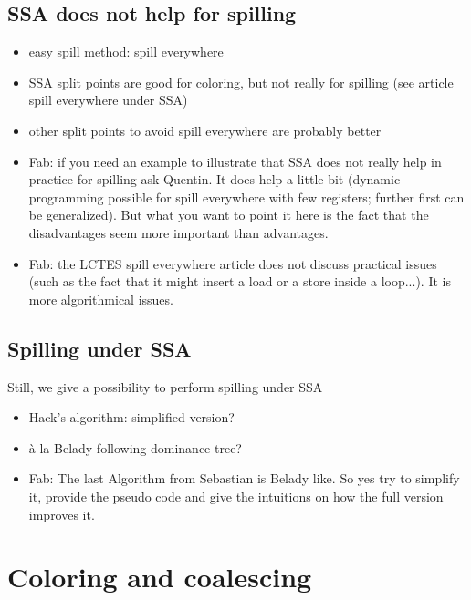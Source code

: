 {\subsection{SSA does not help for spilling}
\begin{itemize}
  \item easy spill method: spill everywhere
  \item SSA split points are good for coloring, but not really for spilling 
    (see article spill everywhere under SSA)
  \item other split points to avoid spill everywhere are probably better
  \item Fab: if you need an example to illustrate that SSA does not really help in practice for spilling ask Quentin. It does help a little bit (dynamic programming possible for spill everywhere with few registers; further first can be generalized). But what you want to point it here is the fact that the disadvantages seem more important than advantages.
  \item Fab: the LCTES spill everywhere article does not discuss practical issues (such as the fact that it might insert a load or a store inside a loop...). It is more algorithmical issues.


\end{itemize}


\subsection{Spilling under SSA}
Still, we give a possibility to perform spilling under SSA
\begin{itemize}
  \item Hack's algorithm: simplified version?
  \item \`a la Belady following dominance tree?

  \item Fab: The last Algorithm from Sebastian is Belady like. So yes try to simplify it, provide the pseudo code and give the intuitions on how the full version improves it.

\end{itemize}



\section{Coloring and coalescing}
}
